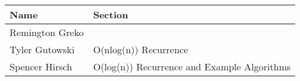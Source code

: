 \documentclass{article}
\begin{document}
\bigskip

\pagebreak

\begin{center}
        \begin{tabular}{|p{3cm}|p{6cm}|}
            \hline
            \textbf{Name} & \textbf{Section} \\
            \hline
            Remington Greko & \\
            \hline
            Tyler Gutowski & O(nlog(n)) Recurrence\\
            \hline
            Spencer Hirsch & O(log(n)) Recurrence and Example Algorithms\\
            \hline
        \end{tabular}
    \end{center}
\end{document}
